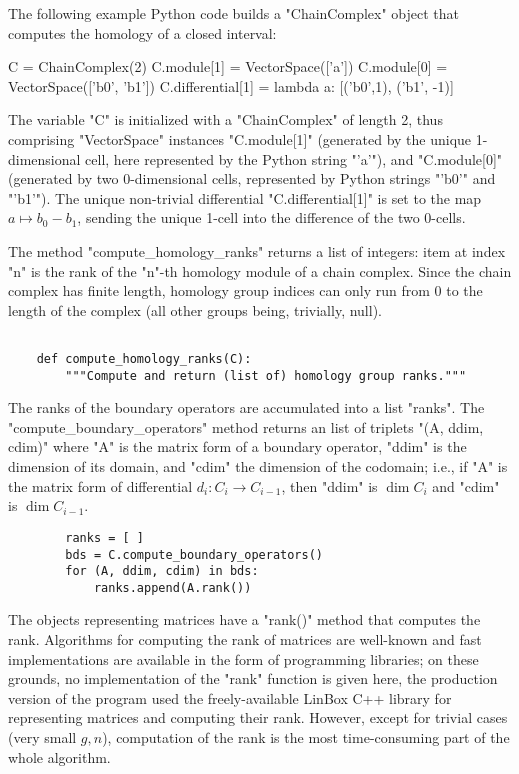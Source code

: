 The following example Python code builds a "ChainComplex" object that
computes the homology of a closed interval:
\begin{codexmp}
  C = ChainComplex(2)
  C.module[1] = VectorSpace(['a'])
  C.module[0] = VectorSpace(['b0', 'b1'])
  C.differential[1] = lambda a: [('b0',1), ('b1', -1)]
\end{codexmp}
The variable "C" is initialized with a "ChainComplex" of length 2,
thus comprising "VectorSpace" instances "C.module[1]" (generated by
the unique 1-dimensional cell, here represented by the Python string
"'a'"), and "C.module[0]" (generated by two 0-dimensional cells,
represented by Python strings "'b0'" and "'b1'").  The unique
non-trivial differential "C.differential[1]" is set to the map $a
\mapsto b_0 - b_1$, sending the unique 1-cell into the difference of
the two 0-cells.


The method "compute_homology_ranks" returns a list of integers: item
at index "n" is the rank of the "n"-th homology module of a chain
complex.  Since the chain complex has finite length, homology group
indices can only run from 0 to the length of the complex (all other
groups being, trivially, null).
\begin{lstlisting}

    def compute_homology_ranks(C):
        """Compute and return (list of) homology group ranks."""

\end{lstlisting}
The ranks of the boundary operators are accumulated into a list
"ranks".  The "compute_boundary_operators" method returns an list of
triplets "(A, ddim, cdim)" where "A" is the matrix form of a boundary
operator, "ddim" is the dimension of its domain, and "cdim" the
dimension of the codomain; i.e., if "A" is the matrix form of
differential $d_i: C_i \to C_{i-1}$, then "ddim" is $\dim C_i$ and
"cdim" is $\dim C_{i-1}$.
\begin{lstlisting}
        ranks = [ ]
        bds = C.compute_boundary_operators()
        for (A, ddim, cdim) in bds:
            ranks.append(A.rank())

\end{lstlisting}
The objects representing matrices have a "rank()" method that computes
the rank.  Algorithms for computing the rank of matrices are
well-known and fast implementations are available in
the form of programming libraries; on these grounds, no implementation
of the "rank" function is given here, the production version of the
program used the freely-available LinBox C++ library
for representing matrices and computing their rank. However, except
for trivial cases (very small $g,n$), computation of the rank is the
most time-consuming part of the whole algorithm.


